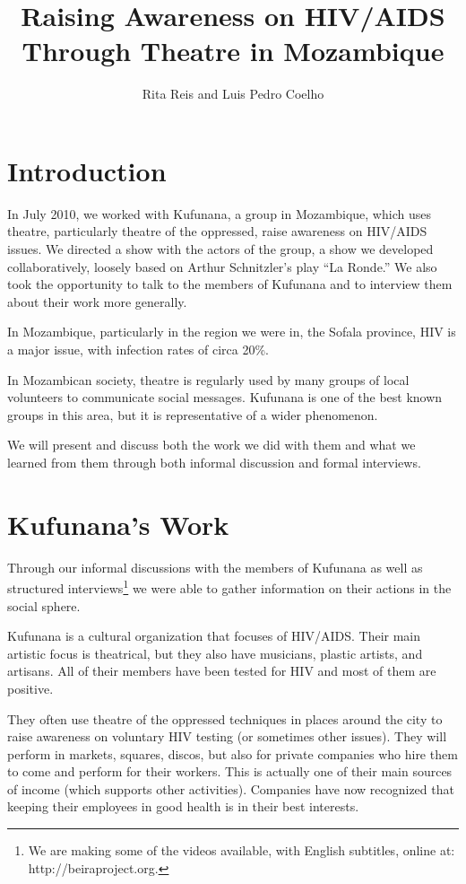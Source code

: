 \documentclass[article,twocolumn]{memoir}
\title{Raising Awareness on HIV/AIDS Through Theatre in Mozambique}
\author{Rita Reis and Luis Pedro Coelho}
\begin{document}
\maketitle

\chapter{Introduction}
In July 2010, we worked with Kufunana, a group in Mozambique, which uses
theatre, particularly theatre of the oppressed, raise awareness on HIV/AIDS
issues. We directed a show with the actors of the group, a show we developed
collaboratively, loosely based on Arthur Schnitzler's play ``La Ronde.'' We
also took the opportunity to talk to the members of Kufunana and to interview
them about their work more generally.

In Mozambique, particularly in the region we were in, the Sofala province, HIV
is a major issue, with infection rates of circa 20\%.

In Mozambican society, theatre is regularly used by many groups of local
volunteers to communicate social messages. Kufunana is one of the best known
groups in this area, but it is representative of a wider phenomenon.

We will present and discuss both the work we did with them and what we learned
from them through both informal discussion and formal interviews.

\chapter{Kufunana's Work}

Through our informal discussions with the members of Kufunana as well as
structured interviews\footnote{We are making some of the videos available, with
English subtitles, online at: http://beiraproject.org.} we were able to gather
information on their actions in the social sphere.

Kufunana is a cultural organization that focuses of HIV/AIDS. Their main
artistic focus is theatrical, but they also have musicians, plastic artists,
and artisans. All of their members have been tested for HIV and most of them are
positive.

They often use theatre of the oppressed techniques in places around the city to
raise awareness on voluntary HIV testing (or sometimes other issues). They will
perform in markets, squares, discos, but also for private companies who hire
them to come and perform for their workers. This is actually one of their main
sources of income (which supports other activities). Companies have now
recognized that keeping their employees in good health is in their best
interests.
\end{document}
